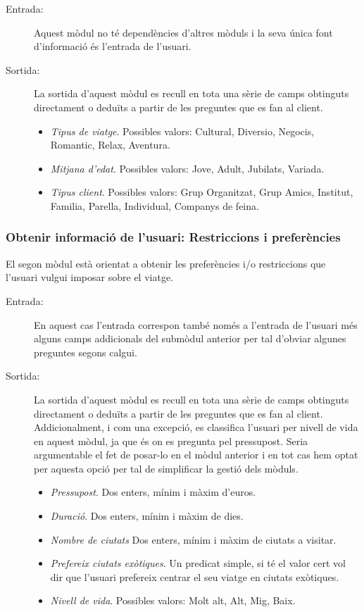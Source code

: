 \documentclass[11pt,a4paper]{article}
\begin{document}
\begin{description}
\item[Entrada:] Aquest mòdul no té dependències d'altres mòduls i la seva única font d'informació és l'entrada de l'usuari.

\item[Sortida:] La sortida d'aquest mòdul es recull en tota una sèrie de camps obtinguts directament o deduïts a partir de les preguntes que es fan al client.
\begin{itemize}
\item \emph{Tipus de viatge}. Possibles valors: Cultural, Diversio, Negocis, Romantic, Relax, Aventura.
\item \emph{Mitjana d'edat}. Possibles valors: Jove, Adult, Jubilats, Variada.
\item \emph{Tipus client}. Possibles valors: Grup Organitzat, Grup Amics, Institut, Familia, Parella, Individual, Companys de feina.
\end{itemize}

\end{description}

\subsubsection[Informació de l'usuari: Preferències]{Obtenir informació de l'usuari: Restriccions i preferències}

El segon mòdul està orientat a obtenir les preferències i/o restriccions que l'usuari vulgui imposar sobre el viatge.

\begin{description}
\item[Entrada:] En aquest cas l'entrada correspon també només a l'entrada de l'usuari més alguns camps addicionals del submòdul anterior per tal d'obviar algunes preguntes segons calgui.

\item[Sortida:] La sortida d'aquest mòdul es recull en tota una sèrie de camps obtinguts directament o deduïts a partir de les preguntes que es fan al client. Addicionalment, i com una excepció, es classifica l'usuari per nivell de vida en aquest mòdul, ja que és on es pregunta pel pressupost. Seria argumentable el fet de posar-lo en el mòdul anterior i en tot cas hem optat per aquesta opció per tal de simplificar la gestió dels mòduls.
\begin{itemize}
\item \emph{Pressupost}. Dos enters, mínim i màxim d'euros.
\item \emph{Duració}. Dos enters, mínim i màxim de dies.
\item \emph{Nombre de ciutats} Dos enters, mínim i màxim de ciutats a visitar.
\item \emph{Prefereix ciutats exòtiques}. Un predicat simple, si té el valor cert vol dir que l'usuari prefereix centrar el seu viatge en ciutats exòtiques.
\item \emph{Nivell de vida}. Possibles valors: Molt alt, Alt, Mig, Baix.
\end{itemize}

\end{description}
\end{document}
